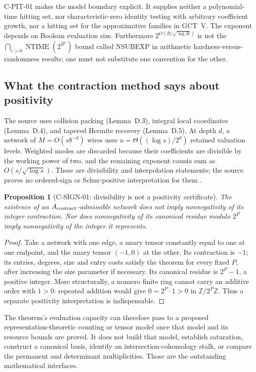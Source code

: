 \documentclass[11pt,a4paper]{article}
\newtheorem{proposition}{Proposition}[section]
\begin{document}
C-PIT-01 makes the model boundary explicit.  It supplies neither a
polynomial-time hitting set, nor characteristic-zero identity testing
with arbitrary coefficient growth, nor a hitting set for the
approximative families in GCT~V.  The exponent depends on Boolean
evaluation size.  Furthermore \(2^{O(B/\sqrt{\log B})}\) is not the
\(\bigcap_{\varepsilon>0}\operatorname{NTIME}(2^{B^\varepsilon})\)
bound called NSUBEXP in arithmetic hardness-versus-randomness results;
one must not substitute one convention for the other.

\subsection{What the contraction method says about positivity}

The source uses collision packing (Lemma~D.3), integral local
coordinates (Lemma~D.4), and tapered Hermite recovery (Lemma~D.5).
At depth \(d\), a network of \(M=O(s8^{-d})\) wires uses
\(u=\Theta((\log s)/2^d)\) retained valuation levels.  Weighted modes
are discarded because their coefficients are divisible by the
working power of two, and the remaining exponent counts sum as
\(O(s/\sqrt{\log s})\).  These are divisibility and interpolation
statements; the source proves no ordered-sign or Schur-positive
interpretation for them \cite[Appendix~D.4]{COAI26}.

\begin{proposition}[C-SIGN-01: divisibility is not a positivity certificate]
The existence of an \(A_{\rm contract}\)-admissible network does not
imply nonnegativity of its integer contraction.  Nor does nonnegativity
of its canonical residue modulo \(2^P\) imply nonnegativity of the
integer it represents.
\end{proposition}
\begin{proof}
Take a network with one edge, a unary tensor constantly equal to one
at one endpoint, and the unary tensor \((-1,0)\) at the other.  Its
contraction is \(-1\); its entries, degrees, size and entry costs
satisfy the theorem for every fixed \(P\), after increasing the
size parameter if necessary.  Its canonical residue is \(2^P-1\),
a positive integer.  More structurally, a nonzero finite ring cannot
carry an additive order with \(1>0\): repeated addition would give
\(0=2^P\cdot1>0\) in \(\mathbb Z/2^P\mathbb Z\).
Thus a separate positivity interpretation is indispensable.
\end{proof}

The theorem's evaluation capacity can therefore pass to a proposed
representation-theoretic counting or tensor model once that model and
its resource bounds are proved.  It does not build that model,
establish saturation, construct a canonical basis, identify an
intersection-cohomology stalk, or compare the permanent and
determinant multiplicities.  Those are the outstanding mathematical
interfaces.
\end{document}
